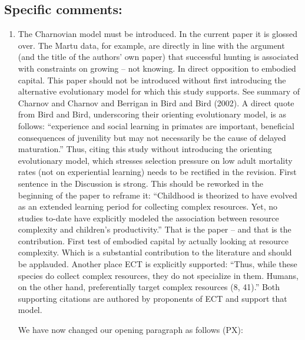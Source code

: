 \documentclass{article}
\newcommand{\rev}[1]{{\color{ForestGreen}#1}}
\begin{document}
\subsection{Specific comments:}
\begin{enumerate}
    \item The Charnovian model must be introduced. In the current paper it is glossed over. The Martu data, for example, are directly in line with the argument (and the title of the authors’ own paper) that successful hunting is associated with constraints on growing – not knowing. In direct opposition to embodied capital. This paper should not be introduced without first introducing the alternative evolutionary model for which this study supports. See summary of Charnov and Charnov and Berrigan in Bird and Bird (2002). A direct quote from Bird and Bird, underscoring their orienting evolutionary model, is as follows: “experience and social learning in primates are important, beneficial consequences of juvenility but may not necessarily be the cause of delayed maturation.” Thus, citing this study without introducing the orienting evolutionary model, which stresses selection pressure on low adult mortality rates (not on experiential learning) needs to be rectified in the revision. First sentence in the Discussion is strong. This should be reworked in the beginning of the paper to reframe it: “Childhood is theorized to have evolved as an extended learning period for collecting complex resources. Yet, no studies to-date have explicitly modeled the association between resource complexity and children’s productivity.” That is the paper – and that is the contribution. First test of embodied capital by actually looking at resource complexity. Which is a substantial contribution to the literature and should be applauded. Another place ECT is explicitly supported: “Thus, while these species do collect complex resources, they do not specialize in them. Humans, on the other hand, preferentially target complex resources (8, 41).” Both supporting citations are authored by proponents of ECT and support that model.
    
\rev{We have now changed our opening paragraph as follows (PX):

}
\end{enumerate}
\end{document}
